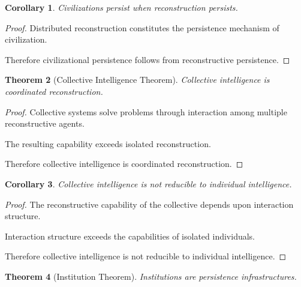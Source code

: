 \documentclass[12pt,oneside]{article}
\newtheorem{theorem}{Theorem}[section] \newtheorem{lemma}[theorem]{Lemma} \newtheorem{proposition}[theorem]{Proposition} \newtheorem{corollary}[theorem]{Corollary}
\theoremstyle{definition}
\begin{document}
\begin{corollary}

Civilizations persist when reconstruction persists.

\end{corollary}

\begin{proof}

Distributed reconstruction constitutes the persistence mechanism of civilization.

Therefore civilizational persistence follows from reconstructive persistence.

\end{proof}

\begin{theorem}[Collective Intelligence Theorem]

Collective intelligence is coordinated reconstruction.

\end{theorem}

\begin{proof}

Collective systems solve problems through interaction among multiple reconstructive agents.

The resulting capability exceeds isolated reconstruction.

Therefore collective intelligence is coordinated reconstruction.

\end{proof}

\begin{corollary}

Collective intelligence is not reducible to individual intelligence.

\end{corollary}

\begin{proof}

The reconstructive capability of the collective depends upon interaction structure.

Interaction structure exceeds the capabilities of isolated individuals.

Therefore collective intelligence is not reducible to individual intelligence.

\end{proof}

\begin{theorem}[Institution Theorem]

Institutions are persistence infrastructures.

\end{theorem}
\end{document}
